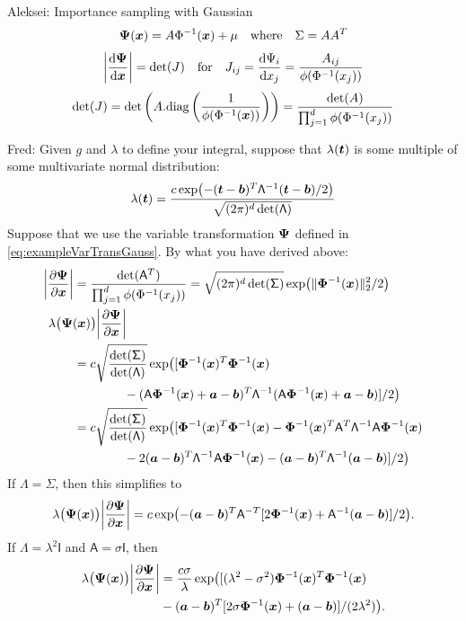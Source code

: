 \documentclass[graybox,footinfo]{svmult}
\newcommand{\QMCPYnormnorm}[2][{}]{\ensuremath{\lVert #2 \rVert}_{#1}}
\newcommand{\QMCPYabs}[1]{\ensuremath{{\left \lvert #1 \right \rvert}}}
\newcommand{\AGSComment}[1]{{\color{cyan} Aleksei: #1}}
\newcommand{\FJHComment}[1]{{\color{magenta} Fred: #1}}
\newcommand{\mA}{\mathsf{A}}
\newcommand{\mSigma}{\mathsf{\Sigma}}
\newcommand{\mLambda}{\mathsf{\Lambda}}
\newcommand{\mI}{\mathsf{I}}
\begin{document}





\AGSComment{
Importance sampling with Gaussian
$$ {\boldsymbol{\Psi}}({\boldsymbol{x}}) = A\Phi^{-1}({\boldsymbol{x}}) + \mu \quad \text{where} \quad \Sigma = AA^T$$
$$ \left\lvert \frac{\mathrm{d} {\boldsymbol{\Psi}}}{\mathrm{d} {\boldsymbol{x}}} \right\rvert = \det(J) \quad \text{for} \quad J_{ij} = \frac{\mathrm{d} \Psi_i}{\mathrm{d} x_j} = \frac{A_{ij}}{\phi(\Phi^{-1}(x_j))}$$
$$ \det(J) = \det\left(A . \text{diag}\left(\frac{1}{\phi(\Phi^{-1}({\boldsymbol{x}}))}\right)\right) = \frac{\det(A)}{\prod_{j=1}^d \phi(\Phi^{-1}(x_j))}$$}

\FJHComment{Given $g$ and $\lambda$ to define your integral, suppose that $\lambda({\boldsymbol{t}})$ is some multiple of some multivariate normal distribution:
	\begin{equation*}
		\lambda(\bst)  = \frac{c \exp\bigl(-(\bst -\bsb)^T \mLambda^{-1}(\bst -\bsb)/2\bigr)}{\sqrt{ (2\pi)^d \det(\mLambda)}} 
	\end{equation*}
Suppose that we use the variable transformation ${\boldsymbol{\Psi}}$ defined in \eqref{eq:exampleVarTransGauss}.  By what you have derived above:
\begin{align*}
	\QMCPYabs{\frac{\partial \bsPsi}{\partial \bsx}} 
	& = \frac{\det(\mA^T)}{\prod_{j=1}^d \phi(\Phi^{-1}(x_j))} = \sqrt{(2\pi)^d \det(\mSigma)} \exp\bigl( \QMCPYnormnorm[2]{\bsPhi^{-1}(\bsx)}^2/2\bigr) \\
	\MoveEqLeft[2]{\lambda\bigl(\bsPsi(\bsx)\bigr) \QMCPYabs{\frac{\partial \bsPsi}{\partial \bsx}}} \\
	& =  c \sqrt{\frac{\det(\mSigma)}{\det(\mLambda)}} \exp \bigl( [ \bsPhi^{-1}(\bsx)^T \bsPhi^{-1}(\bsx) \\
	& \qquad \qquad -   (\mA\bsPhi^{-1}(\bsx) +\bsa -\bsb)^T\mLambda^{-1}(\mA\bsPhi^{-1}(\bsx) +\bsa -\bsb)        ] /2   \bigr) \\
	& =  c \sqrt{\frac{\det(\mSigma)}{\det(\mLambda)}} \exp \bigl( [ \bsPhi^{-1}(\bsx)^T \bsPhi^{-1}(\bsx) 
	-   \bsPhi^{-1}(\bsx)^T\mA^T\mLambda^{-1}\mA \bsPhi^{-1}(\bsx)\\
	& \qquad \qquad  - 2(\bsa -\bsb)^T \mLambda^{-1}\mA\bsPhi^{-1}(\bsx) - (\bsa -\bsb)^T \mLambda^{-1} (\bsa -\bsb)] /2   \bigr) 
\end{align*}
If $\mLambda = \mSigma$, then this simplifies to
\begin{equation*}
		\lambda\bigl(\bsPsi(\bsx)\bigr) \QMCPYabs{\frac{\partial \bsPsi}{\partial \bsx}}
	 =  c \exp \bigl( - (\bsa -\bsb)^T \mA^{-T} [
	2 \bsPhi^{-1}(\bsx) + \mA^{-1}(\bsa -\bsb)] /2   \bigr) .
\end{equation*}
If $\mLambda = \lambda^2 \mI$ and  $\mA = \sigma \mI$, then 
\begin{align*}
	\lambda\bigl(\bsPsi(\bsx)\bigr) \QMCPYabs{\frac{\partial \bsPsi}{\partial \bsx}}
	& = \frac{c\sigma}{\lambda} 
	\exp \bigl( [ (\lambda^2 -\sigma^2)\bsPhi^{-1}(\bsx)^T\bsPhi^{-1}(\bsx) 
	\\
	& -  (\bsa -\bsb)^T [
	2\sigma \bsPhi^{-1}(\bsx) + (\bsa -\bsb)] /(2\lambda^2)   \bigr) .
\end{align*}
}
\end{document}
